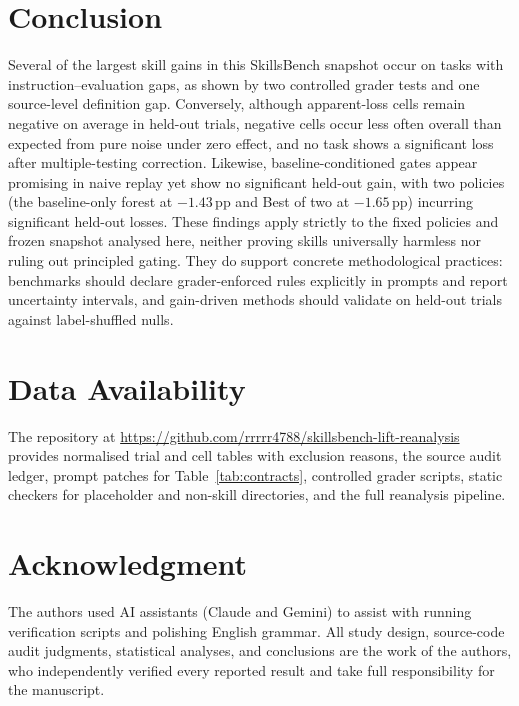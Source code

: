 \documentclass[10pt,conference]{IEEEtran}
\newif\ifkeepcuts \keepcutsfalse
\newcommand{\cut}[1]{\ifkeepcuts #1\fi}
\begin{document}
\section{Conclusion}
Several of the largest skill gains in this SkillsBench snapshot occur on tasks with instruction--evaluation gaps, as shown by two controlled grader tests and one source-level definition gap. Conversely, although apparent-loss cells remain negative on average in held-out trials, negative cells occur less often overall than expected from pure noise under zero effect, and no task shows a significant loss after multiple-testing correction. Likewise, baseline-conditioned gates appear promising in naive replay yet show no significant held-out gain, with two policies (the baseline-only forest at $-1.43$\,pp and Best of two at $-1.65$\,pp) incurring significant held-out losses. These findings apply strictly to the fixed policies and frozen snapshot analysed here, neither proving skills universally harmless nor ruling out principled gating. They do support concrete methodological practices: benchmarks should declare grader-enforced rules explicitly in prompts and report uncertainty intervals, and gain-driven methods should validate on held-out trials against label-shuffled nulls.

\section*{Data Availability}
The repository at \url{https://github.com/rrrrr4788/skillsbench-lift-reanalysis} provides normalised trial and cell tables with exclusion reasons, the source audit ledger, prompt patches for Table~\ref{tab:contracts}, controlled grader scripts, static checkers for placeholder and non-skill directories, and the full reanalysis pipeline.\cut{ All tables and figures are reproducible from these materials, with output files recording random seeds, package versions, input hashes, and per-split held-out trial IDs.}

\section*{Acknowledgment}
The authors used AI assistants (Claude and Gemini) to assist with running verification scripts and polishing English grammar. All study design, source-code audit judgments, statistical analyses, and conclusions are the work of the authors, who independently verified every reported result and take full responsibility for the manuscript.



\end{document}
